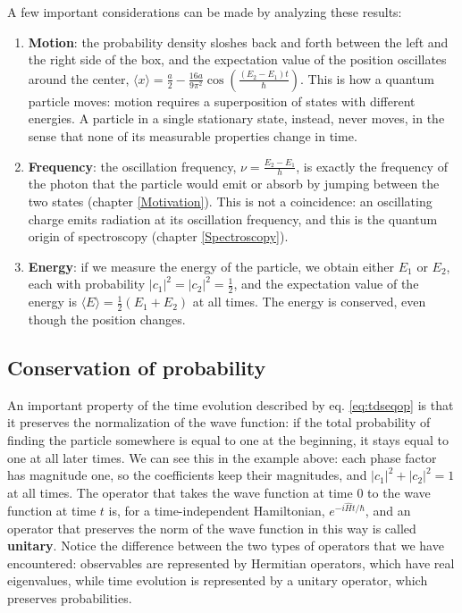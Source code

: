 \documentclass[
  english,
  9pt,
]{extbook}
\newcounter{none} %
\theoremstyle{definition}
\theoremstyle{definition}
\theoremstyle{definition}
\theoremstyle{definition}
\theoremstyle{remark}
\begin{document}
A few important considerations can be made by analyzing these results:

\begin{enumerate}
\def\labelenumi{\arabic{enumi}.}
\item
  \textbf{Motion}: the probability density sloshes back and forth between the left and the right side of the box, and the expectation value of the position oscillates around the center, \(\langle x\rangle=\frac{a}{2}-\frac{16a}{9\pi^2}\cos\left(\frac{(E_2-E_1)t}{\hbar}\right)\). This is how a quantum particle moves: motion requires a superposition of states with different energies. A particle in a single stationary state, instead, never moves, in the sense that none of its measurable properties change in time.
\item
  \textbf{Frequency}: the oscillation frequency, \(\nu=\frac{E_2-E_1}{h}\), is exactly the frequency of the photon that the particle would emit or absorb by jumping between the two states (chapter \ref{Motivation}). This is not a coincidence: an oscillating charge emits radiation at its oscillation frequency, and this is the quantum origin of spectroscopy (chapter \ref{Spectroscopy}).
\item
  \textbf{Energy}: if we measure the energy of the particle, we obtain either \(E_1\) or \(E_2\), each with probability \(|c_1|^2=|c_2|^2=\frac{1}{2}\), and the expectation value of the energy is \(\langle E\rangle=\frac{1}{2}(E_1+E_2)\) at all times. The energy is conserved, even though the position changes.
\end{enumerate}

\subsection{Conservation of probability}\label{conservation-of-probability}

An important property of the time evolution described by eq. \eqref{eq:tdseqop} is that it preserves the normalization of the wave function: if the total probability of finding the particle somewhere is equal to one at the beginning, it stays equal to one at all later times. We can see this in the example above: each phase factor has magnitude one, so the coefficients keep their magnitudes, and \(|c_1|^2+|c_2|^2=1\) at all times. The operator that takes the wave function at time \(0\) to the wave function at time \(t\) is, for a time-independent Hamiltonian, \(e^{-i\hat{H}t/\hbar}\), and an operator that preserves the norm of the wave function in this way is called \textbf{unitary}. Notice the difference between the two types of operators that we have encountered: observables are represented by Hermitian operators, which have real eigenvalues, while time evolution is represented by a unitary operator, which preserves probabilities.
\end{document}
